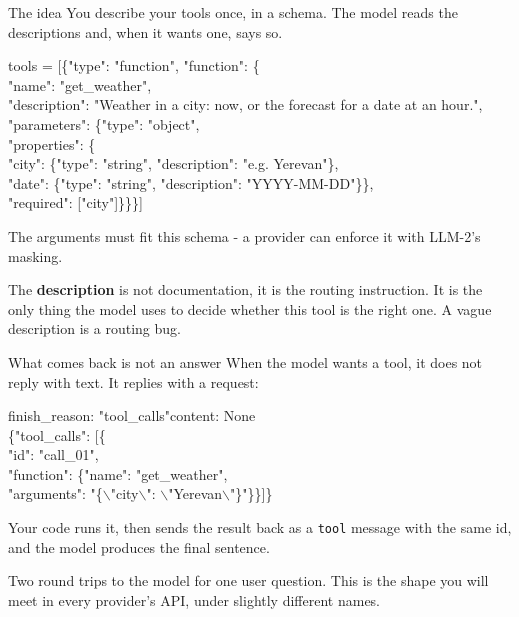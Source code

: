 \documentclass[aspectratio=169]{beamer}
\newcommand{\keybox}[1]{%
  \begin{tcolorbox}[colback=armblue!8, colframe=armblue, boxrule=0.6pt, arc=2pt]
  #1
  \end{tcolorbox}}
\newcommand{\watchbox}[1]{%
  \begin{tcolorbox}[colback=armorange!12, colframe=armorange, boxrule=0.6pt, arc=2pt]
  #1
  \end{tcolorbox}}
\newcommand{\codebox}[1]{%
  \begin{center}
  \begin{tcolorbox}[colback=lightbg, colframe=gray, boxrule=0.5pt, arc=2pt,
                    width=0.94\textwidth, left=4pt, right=4pt, top=3pt, bottom=3pt]
    \ttfamily\scriptsize #1
  \end{tcolorbox}
  \end{center}}
\begin{document}
\begin{frame}{The idea}
  \vspace{0.25em}
  You describe your tools once, in a schema. The model reads the descriptions and, when it
  wants one, says so.

  \codebox{tools = [\{"type": "function", "function": \{\\
  \hspace*{1em}"name": "get\_weather",\\
  \hspace*{1em}"description": "Weather in a city: now, or the forecast for a date at an hour.",\\
  \hspace*{1em}"parameters": \{"type": "object",\\
  \hspace*{2em}"properties": \{\\
  \hspace*{3em}"city": \{"type": "string", "description": "e.g. Yerevan"\},\\
  \hspace*{3em}"date": \{"type": "string", "description": "YYYY-MM-DD"\}\},\\
  \hspace*{2em}"required": ["city"]\}\}\}]}

  \vspace{-0.2em}
  {\footnotesize The arguments must fit this schema - a provider can enforce it with LLM-2's masking.}

  \vspace{0.2em}
  \watchbox{The \textbf{description} is not documentation, it is the routing instruction. It is
  the only thing the model uses to decide whether this tool is the right one. A vague
  description is a routing bug.}
\end{frame}

\begin{frame}{What comes back is not an answer}
  \vspace{0.7em}
  When the model wants a tool, it does not reply with text. It replies with a request:

  \codebox{finish\_reason: "tool\_calls"\qquad content: None\\[0.3em]
  \{"tool\_calls": [\{\\
  \hspace*{1em}"id": "call\_01",\\
  \hspace*{1em}"function": \{"name": "get\_weather",\\
  \hspace*{2em}\qquad\qquad "arguments": "\{$\backslash$"city$\backslash$": $\backslash$"Yerevan$\backslash$"\}"\}\}]\}}

  \vspace{0.5em}
  Your code runs it, then sends the result back as a \texttt{tool} message with the same id, and
  the model produces the final sentence.

  \vspace{0.7em}
  \keybox{Two round trips to the model for one user question. This is the shape you will meet
  in every provider's API, under slightly different names.}
\end{frame}
\end{document}
